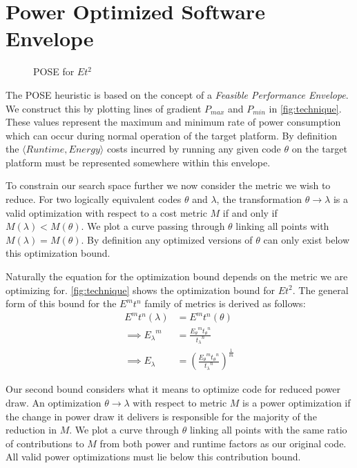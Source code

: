 \section{Power Optimized Software Envelope}
\label{sec:pose}

\begin{figure}
\centering

\caption{POSE for $Et^2$}
\label{fig:technique}
\end{figure}

The POSE heuristic is based on the concept of a \emph{Feasible Performance Envelope}.
We construct this by plotting lines of gradient $P_{max}$ and $P_{min}$ in \autoref{fig:technique}.
These values represent the maximum and minimum rate of power consumption which can occur during normal operation of the target platform. By definition the $\langle Runtime, Energy\rangle$ costs incurred by running any given code $\theta$ on the target platform must be represented somewhere within this envelope.

To constrain our search space further we now consider the metric we wish to reduce.
For two logically equivalent codes $\theta$ and $\lambda$, the transformation ${\theta \to \lambda}$ is a valid optimization with respect to a cost metric $M$ if and only if ${M(\lambda) < M(\theta)}$.
We plot a curve passing through $\theta$ linking all points with ${M(\lambda) = M(\theta)}$.
By definition any optimized versions of $\theta$ can only exist below this optimization bound.

Naturally the equation for the optimization bound depends on the metric we are optimizing for.
\autoref{fig:technique} shows the optimization bound for $Et^2$.
The general form of this bound for the $E^mt^n$ family of metrics is derived as follows:
\begin{align}
E^mt^n(\lambda) &= E^mt^n(\theta) \nonumber \\
\implies {E_\lambda}^m &= \frac{{E_\theta}^m{t_\theta}^n}{{t_\lambda}^n} \nonumber \\
\implies E_\lambda &= (\frac{{E_\theta}^m{t_\theta}^n}{{t_\lambda}^n})^\frac{1}{m}
\label{eq:optimization}
\end{align}

Our second bound considers what it means to optimize code for reduced power draw. 
An optimization $\theta \to \lambda$ with respect to metric $M$ is a power optimization if the change in power draw it delivers is responsible for the majority of the reduction in $M$. We plot a curve through $\theta$ linking all points with the same ratio of contributions to $M$ from both power and runtime factors as our original code. All valid power optimizations must lie below this contribution bound. 

